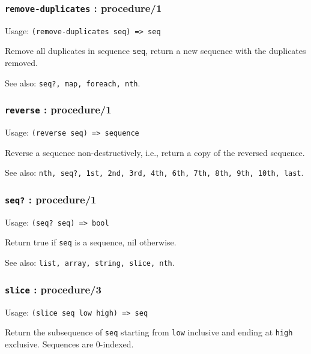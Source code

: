 \documentclass[
]{article}
\newcommand{\passthrough}[1]{#1}
\begin{document}
\hypertarget{remove-duplicates-procedure1}{%
\subsubsection{\texorpdfstring{\texttt{remove-duplicates} :
procedure/1}{remove-duplicates : procedure/1}}\label{remove-duplicates-procedure1}}

Usage: \passthrough{\lstinline!(remove-duplicates seq) => seq!}

Remove all duplicates in sequence \passthrough{\lstinline!seq!}, return
a new sequence with the duplicates removed.

See also: \passthrough{\lstinline!seq?, map, foreach, nth!}.

\hypertarget{reverse-procedure1}{%
\subsubsection{\texorpdfstring{\texttt{reverse} :
procedure/1}{reverse : procedure/1}}\label{reverse-procedure1}}

Usage: \passthrough{\lstinline!(reverse seq) => sequence!}

Reverse a sequence non-destructively, i.e., return a copy of the
reversed sequence.

See also:
\passthrough{\lstinline!nth, seq?, 1st, 2nd, 3rd, 4th, 6th, 7th, 8th, 9th, 10th, last!}.

\hypertarget{seq-procedure1}{%
\subsubsection{\texorpdfstring{\texttt{seq?} :
procedure/1}{seq? : procedure/1}}\label{seq-procedure1}}

Usage: \passthrough{\lstinline!(seq? seq) => bool!}

Return true if \passthrough{\lstinline!seq!} is a sequence, nil
otherwise.

See also: \passthrough{\lstinline!list, array, string, slice, nth!}.

\hypertarget{slice-procedure3}{%
\subsubsection{\texorpdfstring{\texttt{slice} :
procedure/3}{slice : procedure/3}}\label{slice-procedure3}}

Usage: \passthrough{\lstinline!(slice seq low high) => seq!}

Return the subsequence of \passthrough{\lstinline!seq!} starting from
\passthrough{\lstinline!low!} inclusive and ending at
\passthrough{\lstinline!high!} exclusive. Sequences are 0-indexed.
\end{document}
